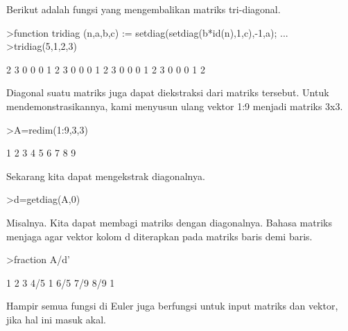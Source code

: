 \documentclass{article}
\begin{document}
\begin{eulernotebook}
\begin{eulercomment}
\begin{eulercomment}
\begin{eulercomment}
\begin{eulercomment}
\begin{eulercomment}
\begin{eulercomment}
\begin{eulercomment}
Berikut adalah fungsi yang mengembalikan matriks tri-diagonal.
\end{eulercomment}
\begin{eulerprompt}
>function tridiag (n,a,b,c) := setdiag(setdiag(b*id(n),1,c),-1,a); ...
>tridiag(5,1,2,3)
\end{eulerprompt}
\begin{euleroutput}
              2             3             0             0             0 
              1             2             3             0             0 
              0             1             2             3             0 
              0             0             1             2             3 
              0             0             0             1             2 
\end{euleroutput}
\begin{eulercomment}
Diagonal suatu matriks juga dapat diekstraksi dari matriks tersebut.
Untuk mendemonstrasikannya, kami menyusun ulang vektor 1:9 menjadi
matriks 3x3.
\end{eulercomment}
\begin{eulerprompt}
>A=redim(1:9,3,3)
\end{eulerprompt}
\begin{euleroutput}
              1             2             3 
              4             5             6 
              7             8             9 
\end{euleroutput}
\begin{eulercomment}
Sekarang kita dapat mengekstrak diagonalnya.
\end{eulercomment}
\begin{eulerprompt}
>d=getdiag(A,0)
\end{eulerprompt}
\begin{euleroutput}
  [1,  5,  9]
\end{euleroutput}
\begin{eulercomment}
Misalnya. Kita dapat membagi matriks dengan diagonalnya. Bahasa
matriks menjaga agar vektor kolom d diterapkan pada matriks baris demi
baris.
\end{eulercomment}
\begin{eulerprompt}
>fraction A/d'
\end{eulerprompt}
\begin{euleroutput}
          1         2         3 
        4/5         1       6/5 
        7/9       8/9         1 
\end{euleroutput}
\begin{eulercomment}
Hampir semua fungsi di Euler juga berfungsi untuk input matriks dan
vektor, jika hal ini masuk akal.



\end{eulercomment}
\end{eulercomment}
\end{eulercomment}
\end{eulercomment}
\end{eulercomment}
\end{eulercomment}
\end{eulercomment}
\end{eulernotebook}
\end{document}
